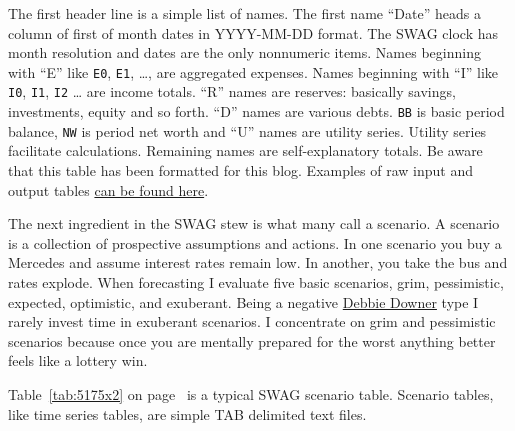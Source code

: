 The first header line is a simple list of names. The first name ``Date''
heads a column of first of month dates in YYYY-MM-DD format. The SWAG
clock has month resolution and dates are the only nonnumeric items.
Names beginning with ``E'' like \texttt{E0}, \texttt{E1}, \ldots{}, are
aggregated expenses. Names beginning with ``I'' like \texttt{I0},
\texttt{I1}, \texttt{I2} \ldots{} are income totals. ``R'' names are
reserves: basically savings, investments, equity and so forth. ``D''
names are various debts. \texttt{BB} is basic period balance, 
\texttt{NW} is period net worth and ``U'' names are utility series.
Utility series facilitate calculations. Remaining names are
self-explanatory totals. Be aware that this table has been formatted for
this blog. Examples of raw input and output tables 
\href{https://github.com/bakerjd99/jacks/tree/master/swag/tabsheets}{can be found here}.

The next ingredient in the SWAG stew is what many call a scenario. A
scenario is a collection of prospective assumptions and actions. In one
scenario you buy a Mercedes and assume interest rates remain low. In
another, you take the bus and rates explode. When forecasting I evaluate
five basic scenarios, grim, pessimistic, expected, optimistic, and
exuberant. Being a negative
\href{http://www.urbandictionary.com/define.php?term=Debbie+Downer}{Debbie
Downer} type I rarely invest time in exuberant scenarios. I concentrate
on grim and pessimistic scenarios because once you are mentally prepared
for the worst anything better feels like a lottery win.

Table~\ref{tab:5175x2} on page~\pageref{tab:5175x2} is a typical SWAG scenario table. Scenario tables, like
time series tables, are simple TAB delimited text files.


